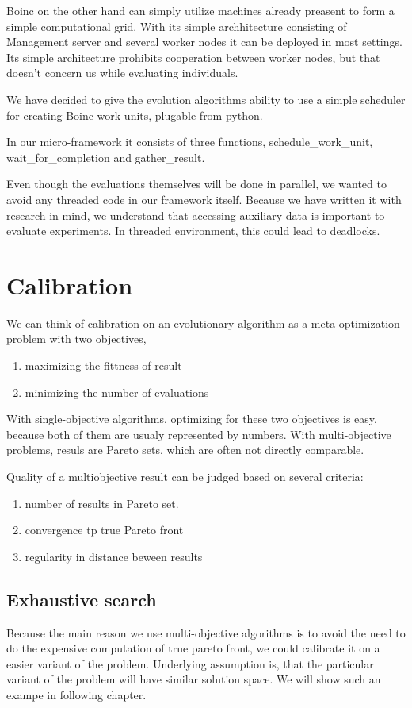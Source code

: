 \documentclass[12pt,oneside,draft]{fithesis2}
\begin{document}
Boinc on the other hand  can simply utilize machines already preasent to form a simple computational grid. With its simple archhitecture consisting of Management server and several worker nodes it can be deployed in most settings. Its simple architecture prohibits cooperation between worker nodes, but that doesn't concern us while evaluating individuals.

We have decided to give the evolution algorithms ability to use a simple scheduler for creating Boinc work units, plugable from python.

In our micro-framework it consists of three functions, schedule\_work\_unit, wait\_for\_completion and gather\_result.

Even though the evaluations themselves will be done in parallel, we wanted to avoid any threaded code in our framework itself. Because we have written it with research in mind, we understand that accessing auxiliary data is important to evaluate experiments. In threaded environment, this could lead to deadlocks.

\section{Calibration}

We can think of calibration on an evolutionary algorithm as a meta-optimization problem with two objectives,

\begin{enumerate}
\item maximizing the fittness of result
\item minimizing the number of evaluations
\end{enumerate}
With single-objective algorithms, optimizing for these two objectives is easy, because both of them are usualy represented by numbers.
With multi-objective problems, resuls are Pareto sets, which are often not directly comparable.

Quality of a multiobjective result can be judged based on several criteria:
\begin{enumerate}
\item number of results in Pareto set.
\item convergence tp true Pareto front
\item regularity in distance beween results
\end{enumerate}


\subsection{Exhaustive search}
Because the main reason we use multi-objective algorithms is to avoid the need to do the expensive computation of true pareto front,
we could calibrate it on a easier variant of the problem. Underlying assumption is, that the particular variant of the problem will have similar solution space. We will show such an exampe in following chapter.
\end{document}

